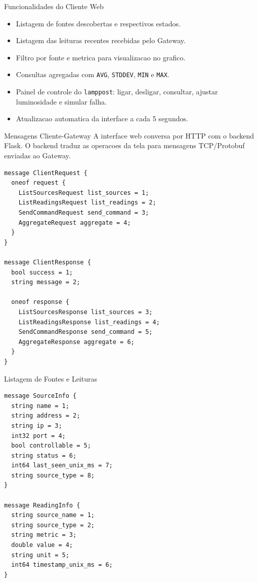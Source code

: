 \documentclass[aspectratio=169]{beamer}
\begin{document}
\begin{frame}{Funcionalidades do Cliente Web}
  \begin{itemize}
    \item Listagem de fontes descobertas e respectivos estados.
    \item Listagem das leituras recentes recebidas pelo Gateway.
    \item Filtro por fonte e metrica para visualizacao no grafico.
    \item Consultas agregadas com \texttt{AVG}, \texttt{STDDEV}, \texttt{MIN} e \texttt{MAX}.
    \item Painel de controle do \texttt{lamppost}: ligar, desligar, consultar, ajustar luminosidade e simular falha.
    \item Atualizacao automatica da interface a cada 5 segundos.
  \end{itemize}
\end{frame}

\begin{frame}[fragile]{Mensagens Cliente-Gateway}
\footnotesize
  A interface web conversa por HTTP com o backend Flask. O backend traduz as operacoes da tela para mensagens TCP/Protobuf enviadas ao Gateway.
\vspace{0.15cm}
\begin{lstlisting}[style=proto,basicstyle=\ttfamily\tiny]
message ClientRequest {
  oneof request {
    ListSourcesRequest list_sources = 1;
    ListReadingsRequest list_readings = 2;
    SendCommandRequest send_command = 3;
    AggregateRequest aggregate = 4;
  }
}

message ClientResponse {
  bool success = 1;
  string message = 2;

  oneof response {
    ListSourcesResponse list_sources = 3;
    ListReadingsResponse list_readings = 4;
    SendCommandResponse send_command = 5;
    AggregateResponse aggregate = 6;
  }
}
\end{lstlisting}
\end{frame}

\begin{frame}[fragile]{Listagem de Fontes e Leituras}
\begin{lstlisting}[style=proto]
message SourceInfo {
  string name = 1;
  string address = 2;
  string ip = 3;
  int32 port = 4;
  bool controllable = 5;
  string status = 6;
  int64 last_seen_unix_ms = 7;
  string source_type = 8;
}

message ReadingInfo {
  string source_name = 1;
  string source_type = 2;
  string metric = 3;
  double value = 4;
  string unit = 5;
  int64 timestamp_unix_ms = 6;
}
\end{lstlisting}
\end{frame}
\end{document}
